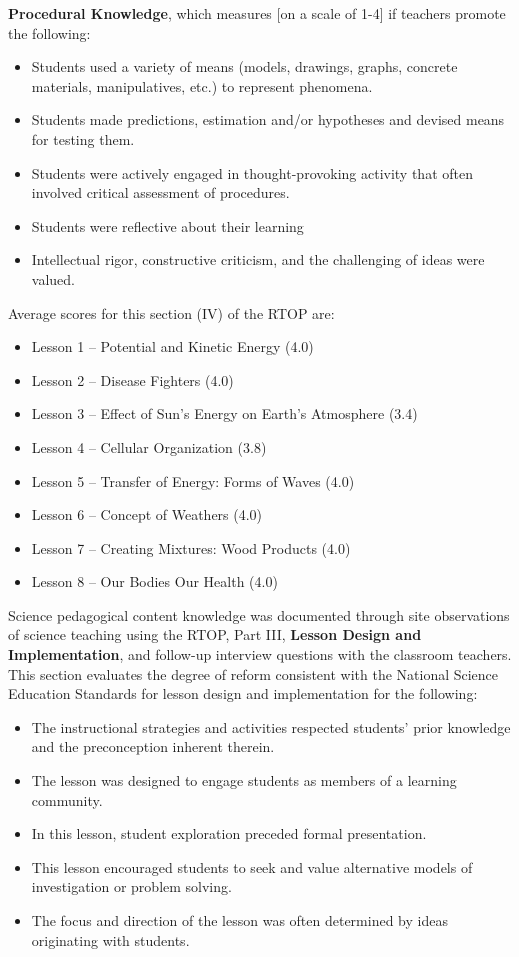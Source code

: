 \documentclass[11.5pt]{sig-alternate} %
\begin{document}
\begin{large}
\textbf{Procedural Knowledge}, which measures [on a scale of 1-4] if teachers promote the following:

\begin{itemize}
    \item Students used a variety of means (models, drawings, graphs, concrete materials, manipulatives, etc.) to represent phenomena.
    \item Students made predictions, estimation and/or hypotheses and devised means for testing them.
    \item Students were actively engaged in thought-provoking activity that often involved critical assessment of procedures.
    \item Students were reflective about their learning
    \item Intellectual rigor, constructive criticism, and the challenging of ideas were valued.
\end{itemize}

Average scores for this section (IV) of the RTOP are: 

\begin{itemize}
    \item Lesson 1 – Potential and Kinetic Energy (4.0)
    \item Lesson 2 – Disease Fighters (4.0)
    \item Lesson 3 – Effect of Sun’s Energy on Earth’s Atmosphere (3.4)
    \item Lesson 4 – Cellular Organization (3.8)
    \item Lesson 5 – Transfer of Energy: Forms of Waves (4.0)
    \item Lesson 6 – Concept of Weathers (4.0)
    \item Lesson 7 – Creating Mixtures: Wood Products (4.0)
    \item Lesson 8 – Our Bodies Our Health (4.0)
\end{itemize}

Science pedagogical content knowledge was documented through site observations of science teaching using the RTOP, Part III, \textbf{Lesson Design and Implementation}, and follow-up interview questions with the classroom teachers. This section evaluates the degree of reform consistent with the National Science Education Standards for lesson design and implementation for the following:

\begin{itemize}
    \item The instructional strategies and activities respected students’ prior knowledge and the preconception inherent therein.
    \item The lesson was designed to engage students as members of a learning community.
    \item In this lesson, student exploration preceded formal presentation.
    \item This lesson encouraged students to seek and value alternative models of investigation or problem solving.
    \item The focus and direction of the lesson was often determined by ideas originating with students.
\end{itemize}


\end{large}
\end{document}
